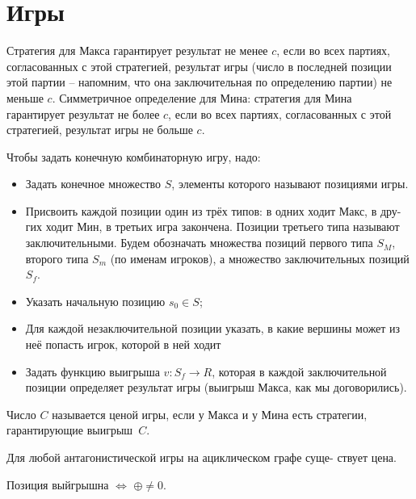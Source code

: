 \documentclass{article}
\newcommand{\lra}{\Leftrightarrow}
\newcommand*{\xor}{\mathbin{\oplus}}
\newenvironment{theorem}[2][Т]{\begin{trivlist}
\item[\hskip \labelsep {\bfseries #1}\hskip \labelsep {\bfseries #2.}]}{\end{trivlist}}
\newenvironment{definition}[2][О]{\begin{trivlist}
\item[\hskip \labelsep {\bfseries #1}\hskip \labelsep {\bfseries #2}]}{\end{trivlist}}
\begin{document}
\section{Игры}

\begin{definition}{Согласованность.}
Стратегия для Макса гарантирует результат не менее $c$, если
во всех партиях, согласованных $с$ этой стратегией, результат игры (число в последней позиции этой партии -- напомним, что она заключительная по определению
партии) не меньше $c$. Симметричное определение для Мина: стратегия для Мина
гарантирует результат не более $c$, если во всех партиях, согласованных $с$ этой
стратегией, результат игры не больше $c$.
\end{definition}
\begin{definition}{Конечная комб игра}
Чтобы задать конечную комбинаторную игру, надо:
\begin{itemize}
\item Задать конечное множество $S$, элементы которого называют позициями игры.
\item Присвоить каждой позиции один из трёх типов: в одних ходит Макс, в дру-
гих ходит Мин, в третьих игра закончена. Позиции третьего типа называют
заключительными. Будем обозначать множества позиций первого типа $S_M$,
второго типа $S_m$ (по именам игроков), а множество заключительных позиций
$S_f$.
\item Указать начальную позицию $s_0 \in S$;
\item Для каждой незаключительной позиции указать, в какие вершины может из
неё попасть игрок, которой в ней ходит
\item Задать функцию выигрыша $v : S_f \to R$, которая в каждой заключительной
позиции определяет результат игры (выигрыш Макса, как мы договорились).
\end{itemize}
\end{definition}

\begin{definition}{Цена игры.}
Число $C$ называется ценой игры, если у Макса и у Мина есть
стратегии, гарантирующие выигрыш~$C$.
\end{definition}

\begin{theorem}{Существование цены.}
Для любой антагонистической игры на ациклическом графе суще-
ствует цена.
\end{theorem}

\begin{theorem}{Ним}
Позиция выйгрышна $\lra$ $\xor \neq 0$. 
\end{theorem}
\end{document}
